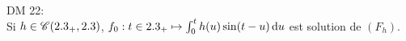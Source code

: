 DM 22: \\
Si $h \in \mathscr{C}(2.3_+, 2.3)$, $f_0 : t \in 2.3_+ \mapsto \int_{0}^{t} h(u) \sin(t-u) \, \mathrm{d} u$ est solution de $(F_h)$.